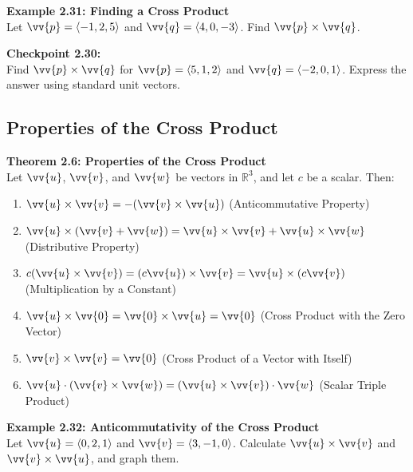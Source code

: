 \documentclass{article}
\begin{document}
\begin{examplebox}
    \textbf{Example 2.31: Finding a Cross Product} \\
    Let \(\vv{p} = \langle -1, 2, 5 \rangle\) and \(\vv{q} = \langle 4, 0, -3 \rangle\). Find \(\vv{p} \times \vv{q}\).
\end{examplebox}

\begin{exercisebox}
    \textbf{Checkpoint 2.30:} \\
    Find \(\vv{p} \times \vv{q}\) for \(\vv{p} = \langle 5, 1, 2 \rangle\) and \(\vv{q} = \langle -2, 0, 1 \rangle\). Express the answer using standard unit vectors.
\end{exercisebox}

\subsection*{Properties of the Cross Product}

\begin{theorembox}
    \textbf{Theorem 2.6: Properties of the Cross Product} \\
    Let \(\vv{u}\), \(\vv{v}\), and \(\vv{w}\) be vectors in \(\mathbb{R}^3\), and let \(c\) be a scalar. Then:
    \begin{enumerate}
        \item \(\vv{u} \times \vv{v} = -(\vv{v} \times \vv{u})\) \quad (Anticommutative Property)
        \item \(\vv{u} \times (\vv{v} + \vv{w}) = \vv{u} \times \vv{v} + \vv{u} \times \vv{w}\) \quad (Distributive Property)
        \item \(c(\vv{u} \times \vv{v}) = (c\vv{u}) \times \vv{v} = \vv{u} \times (c\vv{v})\) \quad (Multiplication by a Constant)
        \item \(\vv{u} \times \vv{0} = \vv{0} \times \vv{u} = \vv{0}\) \quad (Cross Product with the Zero Vector)
        \item \(\vv{v} \times \vv{v} = \vv{0}\) \quad (Cross Product of a Vector with Itself)
        \item \(\vv{u} \cdot (\vv{v} \times \vv{w}) = (\vv{u} \times \vv{v}) \cdot \vv{w}\) \quad (Scalar Triple Product)
    \end{enumerate}
\end{theorembox}

\begin{examplebox}
    \textbf{Example 2.32: Anticommutativity of the Cross Product} \\
    Let \(\vv{u} = \langle 0, 2, 1 \rangle\) and \(\vv{v} = \langle 3, -1, 0 \rangle\). Calculate \(\vv{u} \times \vv{v}\) and \(\vv{v} \times \vv{u}\), and graph them.
\end{examplebox}
\end{document}

